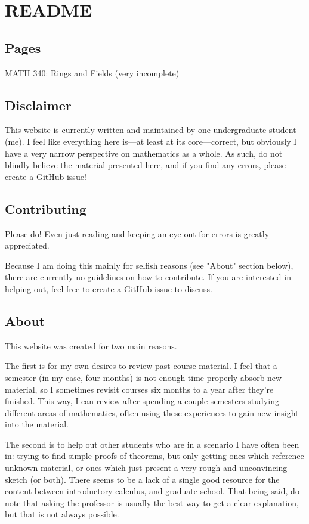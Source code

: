 \documentclass{scrartcl}
\begin{document}
\section{README}

\subsection{Pages}

\href{math340.html}{MATH 340: Rings and Fields} (very incomplete)

\subsection{Disclaimer}

This website is currently written and maintained by one undergraduate student (me).
I feel like everything here is---at least at its core---correct, but obviously I have a very narrow perspective on
mathematics as a whole.
As such, do not blindly believe the material presented here, and if you find any errors, please create a
\href{https://github.com/xtevenx/ugm/issues}{GitHub issue}!

\subsection{Contributing}

Please do! Even just reading and keeping an eye out for errors is greatly appreciated.

Because I am doing this mainly for selfish reasons (see "About" section below), there are currently no guidelines on
how to contribute.
If you are interested in helping out, feel free to create a GitHub issue to discuss.

\subsection{About}

This website was created for two main reasons.

The first is for my own desires to review past course material.
I feel that a semester (in my case, four months) is not enough time properly absorb new material, so I sometimes
revisit courses six months to a year after they're finished.
This way, I can review after spending a couple semesters studying different areas of mathematics, often using these
experiences to gain new insight into the material.

The second is to help out other students who are in a scenario I have often been in: trying to find simple proofs of
theorems, but only getting ones which reference unknown material, or ones which just present a very rough and
unconvincing sketch (or both).
There seems to be a lack of a single good resource for the content between introductory calculus, and graduate school.
That being said, do note that asking the professor is usually the best way to get a clear explanation, but that is not
always possible.
\end{document}
